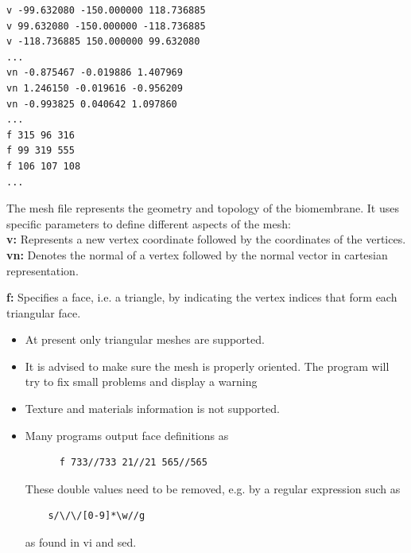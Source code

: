 \documentclass[11pt]{article}
\begin{document}
\begin{mdframed}[backgroundcolor=lightgray, linecolor=lightgray]  %
\begin{verbatim}
v -99.632080 -150.000000 118.736885
v 99.632080 -150.000000 -118.736885
v -118.736885 150.000000 99.632080
... 
vn -0.875467 -0.019886 1.407969
vn 1.246150 -0.019616 -0.956209
vn -0.993825 0.040642 1.097860
...
f 315 96 316
f 99 319 555
f 106 107 108
...
\end{verbatim}
\end{mdframed}
\noindent
The mesh file represents the geometry and topology of the biomembrane. It uses specific parameters to define different aspects of the mesh: 
\\
\noindent
\textbf{v:} Represents a new vertex coordinate followed by the coordinates of the vertices.
\noindent
\textbf{vn:} Denotes the normal of a vertex followed by the normal vector in cartesian representation.

\noindent
\textbf{f:} Specifies a face, i.e. a triangle, by indicating the vertex indices that form each triangular face.
\begin{tcolorbox}[colback=red!5!white,colframe=red!75!black,title=Warning]
\begin{itemize}
    \item At present only triangular meshes are supported.
    \item It is advised to make sure the mesh is properly oriented. The program will try to fix small problems and display a warning
    \item Texture and materials information is not supported.
    \item Many programs output face definitions as\\
    \begin{verbatim}
      f 733//733 21//21 565//565  
    \end{verbatim}
    These double values need to be removed, e.g. by a regular expression such as
    \begin{verbatim}
    s/\/\/[0-9]*\w//g                             
    \end{verbatim}
    as found in vi and sed.
    \end{itemize}
\end{tcolorbox}

\end{document}

